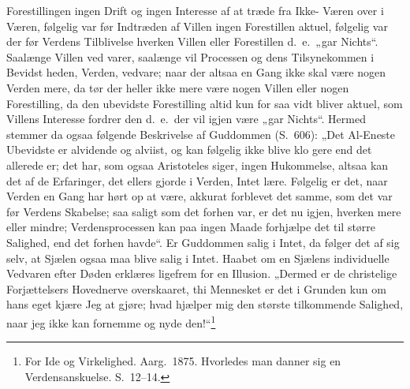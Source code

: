 \documentclass[12pt,a4paper]{article}
\newcommand{\opage}[1]{\marginnote{\footnotesize\textit{[#1]}}}
\begin{document}
Forestillingen ingen Drift og ingen Interesse af at træde fra Ikke-%
Væren over i Væren, følgelig var før Indtræden af Villen ingen
Forestillen aktuel, følgelig var der før Verdens Tilblivelse hverken
Villen eller Forestillen d.\ e.\ „gar Nichts“. Saalænge Villen ved\-%
varer, saalænge vil Processen og dens Tilsynekommen i Bevidst\-%
heden, Verden, vedvare; naar der altsaa en Gang ikke skal være
nogen Verden mere, da tør der heller ikke mere være nogen
Villen eller nogen Forestilling, da den ubevidste Forestilling altid
kun for saa vidt bliver aktuel, som Villens Interesse fordrer den
d.\ e.\ der vil igjen være „gar Nichts“. Hermed stemmer da ogsaa
følgende Beskrivelse af Guddommen (S.\ 606): „Det Al-Eneste
Ubevidste er alvidende og alviist, og kan følgelig ikke blive klo\-%
gere end det allerede er; det har, som ogsaa Aristoteles siger,
ingen Hukommelse, altsaa kan det af de Erfaringer, det ellers
gjorde i Verden, Intet lære. Følgelig er det, naar Verden en
Gang har hørt op at være, akkurat forblevet det samme, som det
var før Verdens Skabelse; saa saligt som det forhen var, er det
nu igjen, hverken mere eller mindre; Verdensprocessen kan paa
ingen Maade forhjælpe det til større Salighed, end det forhen
havde“. Er Guddommen salig i Intet, da følger det af sig selv,
at Sjælen ogsaa maa blive salig i Intet. Haabet om en Sjælens
individuelle Vedvaren efter Døden erklæres ligefrem for en Illusion.
\opage{49}„Dermed er de christelige Forjættelsers Hovednerve overskaaret,
thi Mennesket er det i Grunden kun om hans eget kjære Jeg at
gjøre; hvad hjælper mig den største tilkommende Salighed, naar
jeg ikke kan fornemme og nyde den!“\footnote{For Ide og Virkelighed. Aarg.\ 1875. Hvorledes man danner sig en
Verdensanskuelse. S.\ 12--14.} %
\end{document}
